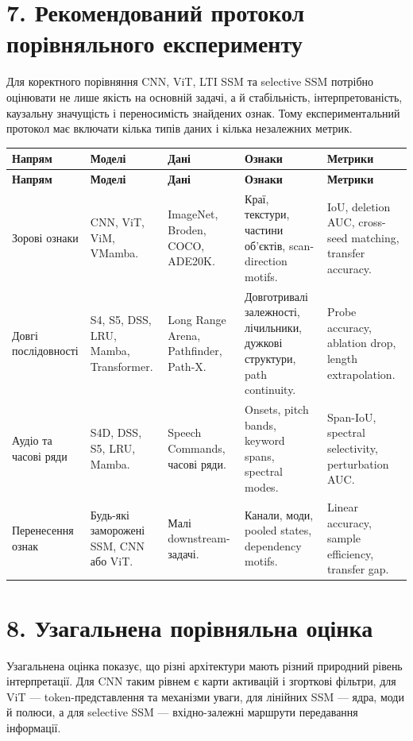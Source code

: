 \documentclass[12pt,a4paper]{article}
\begin{document}
\section*{7. Рекомендований протокол порівняльного експерименту}

Для коректного порівняння CNN, ViT, LTI SSM та selective SSM потрібно
оцінювати не лише якість на основній задачі, а й стабільність,
інтерпретованість, каузальну значущість і переносимість знайдених
ознак. Тому експериментальний протокол має включати кілька типів
даних і кілька незалежних метрик.

\begin{longtable}{p{3cm} p{3cm} p{3.2cm} p{3.4cm} p{3.6cm}}
\toprule
\textbf{Напрям}
&
\textbf{Моделі}
&
\textbf{Дані}
&
\textbf{Ознаки}
&
\textbf{Метрики}
\\
\midrule
\endfirsthead

\toprule
\textbf{Напрям}
&
\textbf{Моделі}
&
\textbf{Дані}
&
\textbf{Ознаки}
&
\textbf{Метрики}
\\
\midrule
\endhead

Зорові ознаки
&
CNN, ViT, ViM, VMamba.
&
ImageNet, Broden, COCO, ADE20K.
&
Краї, текстури, частини об'єктів, scan-direction motifs.
&
IoU, deletion AUC, cross-seed matching, transfer accuracy.
\\

Довгі послідовності
&
S4, S5, DSS, LRU, Mamba, Transformer.
&
Long Range Arena, Pathfinder, Path-X.
&
Довготривалі залежності, лічильники, дужкові структури, path continuity.
&
Probe accuracy, ablation drop, length extrapolation.
\\

Аудіо та часові ряди
&
S4D, DSS, S5, LRU, Mamba.
&
Speech Commands, часові ряди.
&
Onsets, pitch bands, keyword spans, spectral modes.
&
Span-IoU, spectral selectivity, perturbation AUC.
\\

Перенесення ознак
&
Будь-які заморожені SSM, CNN або ViT.
&
Малі downstream-задачі.
&
Канали, моди, pooled states, dependency motifs.
&
Linear accuracy, sample efficiency, transfer gap.
\\
\bottomrule
\end{longtable}

\section*{8. Узагальнена порівняльна оцінка}

Узагальнена оцінка показує, що різні архітектури мають різний
природний рівень інтерпретації. Для CNN таким рівнем є карти
активацій і згорткові фільтри, для ViT — token-представлення та
механізми уваги, для лінійних SSM — ядра, моди й полюси, а для
selective SSM — вхідно-залежні маршрути передавання інформації.
\end{document}
